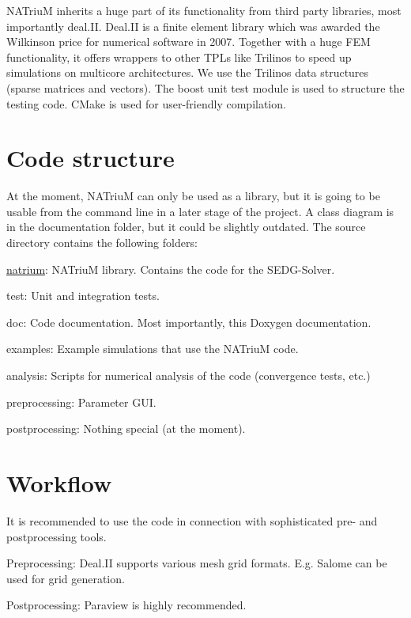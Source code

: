 NATriuM inherits a huge part of its functionality from third party libraries, most importantly deal.II. Deal.II is a finite element library which was awarded the Wilkinson price for numerical software in 2007. Together with a huge FEM functionality, it offers wrappers to other TPLs like Trilinos to speed up simulations on multicore architectures. We use the Trilinos data structures (sparse matrices and vectors). The boost unit test module is used to structure the testing code. CMake is used for user-\/friendly compilation.\hypertarget{index_struct_sec}{}\section{Code structure}\label{index_struct_sec}
At the moment, NATriuM can only be used as a library, but it is going to be usable from the command line in a later stage of the project. A class diagram is in the documentation folder, but it could be slightly outdated. The source directory contains the following folders:
\begin{DoxyItemize}
\item \hyperlink{namespacenatrium}{natrium}: NATriuM library. Contains the code for the SEDG-\/Solver.
\item test: Unit and integration tests.
\item doc: Code documentation. Most importantly, this Doxygen documentation.
\item examples: Example simulations that use the NATriuM code.
\item analysis: Scripts for numerical analysis of the code (convergence tests, etc.)
\item preprocessing: Parameter GUI.
\item postprocessing: Nothing special (at the moment).
\end{DoxyItemize}\hypertarget{index_workflow_sec}{}\section{Workflow}\label{index_workflow_sec}
It is recommended to use the code in connection with sophisticated pre-\/ and postprocessing tools.
\begin{DoxyItemize}
\item Preprocessing: Deal.II supports various mesh grid formats. E.g. Salome can be used for grid generation.
\item Postprocessing: Paraview is highly recommended.
\end{DoxyItemize}

